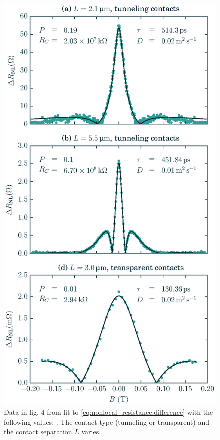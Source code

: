\begin{figure}[b]
  \caption{
    Data in fig. 4 from \cite{PhysRevLett.105.167202}
    fit to \cref{eq:nonlocal_resistance.difference}
    with the following values: \plotDifferenceInfo.
    The contact type (tunneling or transparent)
    and the contact separation $L$ varies.
  }
  \label{fig:nonlocal_resistance.difference}
  \includegraphics[width=\columnwidth]{figures/plot_difference}
\end{figure}

